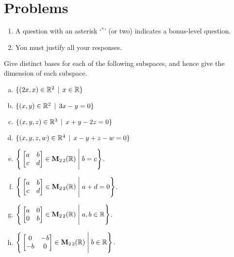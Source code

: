 \section*{Problems}


 
\begin{enumerate}
\item A question with an asterisk `$ ^\ast$' (or two) indicates a bonus-level question.
 \item You must justify all your responses.
\end{enumerate}
\smallskip



 \begin{prob} \label{prob09.1} Give  distinct bases for each of the following subspaces, and hence give the dimension of each subspace.
\medskip

\begin{enumerate}[a)]

\item  $\{(2x, x) \in \mathbb{R}^2\,\mid \, x\in \mathbb{R} \}$\medskip

\item\sov  $\{(x, y) \in \mathbb{R}^2\,\mid \, 3x - y=0  \}$ \medskip
%


 
\item  $\{(x, y, z) \in \mathbb{R}^3\,\mid \, x+y-2z=0  \}$   \medskip
%

\item\sov  $\{(x, y, z, w) \in \mathbb{R}^4\,\mid \, x-y+z-w=0  \}$   \medskip
%

\item  $\Bigg\{  \bmatrix a&b\\ c&d\endbmatrix \in \M_{2 \,2}(\R) \;\Bigg|\; b=c\Bigg\}$.\medskip \medskip
%

\item\sov  $\Bigg\{  \bmatrix a&b\\ c&d\endbmatrix \in \M_{2 \,2}(\R) \;\Bigg|\; a+d=0\Bigg\}$. \medskip
%

\item  $\Bigg\{  \bmatrix a&0\\ 0&b\endbmatrix \in \M_{2 \,2}(\R) \;\Bigg|\;  a, b \in \R\Bigg\}$. \medskip
%


\item\sov  $\Bigg\{  \bmatrix 0&-b\\ -b&0\endbmatrix \in \M_{2 \,2}(\R) \;\Bigg|\; b \in \R\Bigg\}$.      \medskip
%


\end{enumerate}
\end{prob}
